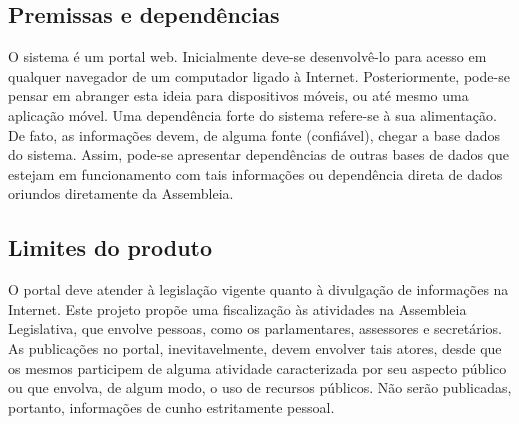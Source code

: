 \documentclass[12pt, a4paper]{article}
\begin{document}
        \subsection{Premissas e dependências}
        O sistema é um portal web. Inicialmente deve-se desenvolvê-lo para
        acesso em qualquer navegador de um computador ligado à Internet.
        Posteriormente, pode-se pensar em abranger esta ideia para dispositivos
        móveis, ou até mesmo uma aplicação móvel.
        Uma dependência forte do sistema refere-se à sua alimentação. De fato, as informações devem, de alguma fonte (confiável), chegar a base dados do sistema. Assim, pode-se apresentar dependências de outras bases de dados que estejam em funcionamento com tais informações ou dependência direta de dados oriundos diretamente da Assembleia.

        \subsection{Limites do produto}
        O portal deve atender à legislação vigente quanto à divulgação de
        informações na Internet. Este projeto propõe uma fiscalização às
        atividades na Assembleia Legislativa, que envolve pessoas, como os
        parlamentares, assessores e secretários. As publicações no portal,
        inevitavelmente, devem envolver tais atores, desde que os mesmos
        participem de alguma atividade caracterizada por seu aspecto público ou
        que envolva, de algum modo, o uso de recursos públicos. Não serão
        publicadas, portanto, informações de cunho estritamente pessoal.
\end{document}
